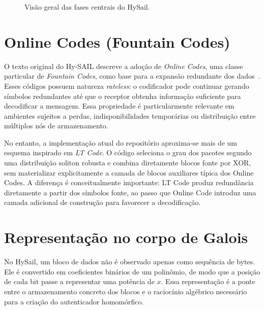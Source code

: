\begin{figure}[!ht]
  \centering
  \caption{Visão geral das fases centrais do HySail.}
\end{figure}

\section{Online Codes (Fountain Codes)}%
O texto original do Hy-SAIL descreve a adoção de \emph{Online Codes}, uma classe particular de \emph{Fountain Codes}, como base para a expansão redundante dos dados~\cite{amaral2013hysail}. Esses códigos possuem natureza \emph{rateless}: o codificador pode continuar gerando símbolos redundantes até que o receptor obtenha informação suficiente para decodificar a mensagem. Essa propriedade é particularmente relevante em ambientes sujeitos a perdas, indisponibilidades temporárias ou distribuição entre múltiplos nós de armazenamento.

No entanto, a implementação atual do repositório aproxima-se mais de um esquema inspirado em \emph{LT Code}. O código seleciona o grau dos pacotes segundo uma distribuição soliton robusta e combina diretamente blocos fonte por XOR, sem materializar explicitamente a camada de blocos auxiliares típica dos Online Codes. A diferença é conceitualmente importante: LT Code produz redundância diretamente a partir dos símbolos fonte, ao passo que Online Code introduz uma camada adicional de construção para favorecer a decodificação.

\section{Representação no corpo de Galois}%
No HySail, um bloco de dados não é observado apenas como sequência de bytes. Ele é convertido em coeficientes binários de um polinômio, de modo que a posição de cada bit passe a representar uma potência de $x$. Essa representação é a ponte entre o armazenamento concreto dos blocos e o raciocínio algébrico necessário para a criação do autenticador homomórfico.


